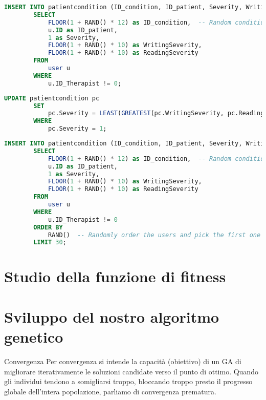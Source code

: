 \documentclass{article}
\begin{document}
    \begin{lstlisting}[language=SQL, breaklines, caption=Generazione delle severity (tutti gli user)]
        INSERT INTO patientcondition (ID_condition, ID_patient, Severity, WritingSeverity, ReadingSeverity)
        SELECT
            FLOOR(1 + RAND() * 12) as ID_condition,  -- Random condition ID (1 to 12)
            u.ID as ID_patient,
            1 as Severity,
            FLOOR(1 + RAND() * 10) as WritingSeverity,
            FLOOR(1 + RAND() * 10) as ReadingSeverity
        FROM
            user u
        WHERE
            u.ID_Therapist != 0;
    \end{lstlisting}

    \begin{lstlisting}[language=SQL, breaklines, caption=Generazione delle severity (tutti gli user) pt.2]
        UPDATE patientcondition pc
        SET
            pc.Severity = LEAST(GREATEST(pc.WritingSeverity, pc.ReadingSeverity) + IF(RAND() < 0.5, -1, 1), 10)
        WHERE
            pc.Severity = 1;
    \end{lstlisting}

    \begin{lstlisting}[language=SQL, breaklines, caption=Generazione delle severity (solo x users)]
        INSERT INTO patientcondition (ID_condition, ID_patient, Severity, WritingSeverity, ReadingSeverity)
        SELECT
            FLOOR(1 + RAND() * 12) as ID_condition,  -- Random condition ID (1 to 12)
            u.ID as ID_patient,
            1 as Severity,
            FLOOR(1 + RAND() * 10) as WritingSeverity,
            FLOOR(1 + RAND() * 10) as ReadingSeverity
        FROM
            user u
        WHERE
            u.ID_Therapist != 0
        ORDER BY
            RAND()  -- Randomly order the users and pick the first one
        LIMIT 30;
    \end{lstlisting}

\pagebreak

    \section{Studio della funzione di fitness}

    \section{Sviluppo del nostro algoritmo genetico}

    Convergenza Per convergenza si intende la capacità (obiettivo) di un GA di migliorare iterativamente le soluzioni candidate verso il punto di ottimo. Quando gli
    individui tendono a somigliarsi troppo, bloccando troppo presto il progresso globale dell’intera popolazione, parliamo di convergenza prematura.
\end{document}
